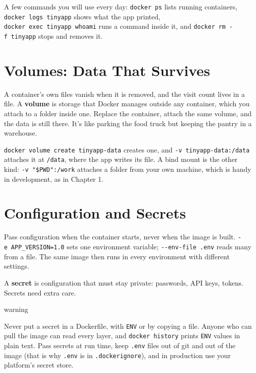 A few commands you will use every day: \texttt{docker\ ps} lists running containers, \texttt{docker\ logs\ tinyapp} shows what the app printed, \texttt{docker\ exec\ tinyapp\ whoami} runs a command inside it, and \texttt{docker\ rm\ -f\ tinyapp} stops and removes it.

\section{Volumes: Data That Survives}\label{05-docker-in-practice:volumes-data-that-survives}

A container's own files vanish when it is removed, and the visit count lives in a file. A \textbf{volume} is storage that Docker manages outside any container, which you attach to a folder inside one. Replace the container, attach the same volume, and the data is still there. It's like parking the food truck but keeping the pantry in a warehouse.

\texttt{docker\ volume\ create\ tinyapp-}\allowbreak{}\texttt{data} creates one, and \texttt{-v\ tinyapp-data:/}\allowbreak{}\texttt{data} attaches it at \texttt{/data}, where the app writes its file. A bind mount is the other kind: \texttt{-v\ "\$PWD":/work} attaches a folder from your own machine, which is handy in development, as in Chapter 1.

\section{Configuration and Secrets}\label{05-docker-in-practice:configuration-and-secrets}

Pass configuration when the container starts, never when the image is built. \texttt{-e\ APP\_VERSION=}\allowbreak{}\texttt{1.0} sets one environment variable; \texttt{-\/-env-file\ .env} reads many from a file. The same image then runs in every environment with different settings.

A \textbf{secret} is configuration that must stay private: passwords, API keys, tokens. Secrets need extra care.

\begin{callout}{warning}

Never put a secret in a Dockerfile, with \texttt{ENV} or by copying a file. Anyone who can pull the image can read every layer, and \texttt{docker\ history} prints \texttt{ENV} values in plain text. Pass secrets at run time, keep \texttt{.env} files out of git and out of the image (that is why \texttt{.env} is in \texttt{.dockerignore}), and in production use your platform's secret store.

\end{callout}

